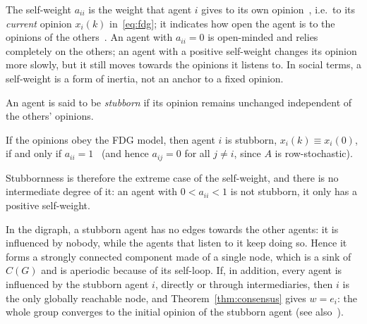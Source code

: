 The self-weight $a_{ii}$ is the weight that agent $i$ gives to its own
opinion~\cite{bullo2024lns}, i.e.\ to its \emph{current} opinion $x_i(k)$
in~\eqref{eq:fdg}; it indicates how open the agent is to the opinions of the
others~\cite{proskurnikov2017tutorial}.
 An agent with $a_{ii} = 0$ is open-minded and
relies completely on the others; an agent with a positive self-weight changes its
opinion more slowly, but it still moves towards the opinions it listens to. In social
terms, a self-weight is a form of inertia, not an anchor to a fixed opinion.

\begin{definition}
\label{def:stubborn}
An agent is said to be \emph{stubborn} if its opinion remains unchanged independent
of the others' opinions.
\end{definition}

If the opinions obey the FDG model, then agent $i$ is stubborn, $x_i(k) \equiv x_i(0)$,
if and only if $a_{ii} = 1$~\cite{proskurnikov2017tutorial} (and hence $a_{ij} = 0$
for all $j \neq i$, since $A$ is row-stochastic).

Stubbornness is therefore the extreme case of the self-weight, and there is no
intermediate degree of it: an agent with $0 < a_{ii} < 1$ is not stubborn, it only has
a positive self-weight.

In the digraph, a stubborn agent has no edges towards the other agents: it is
influenced by nobody, while the agents that listen to it keep doing so. Hence it forms
a strongly connected component made of a single node, which is a sink of $C(G)$ and is
aperiodic because of its self-loop. If, in addition, every agent is influenced by the
stubborn agent $i$, directly or through intermediaries, then $i$ is the only globally
reachable node, and Theorem~\ref{thm:consensus} gives $w = e_i$: the whole group
converges to the initial opinion of the stubborn agent (see
also~\cite{proskurnikov2017tutorial}).

